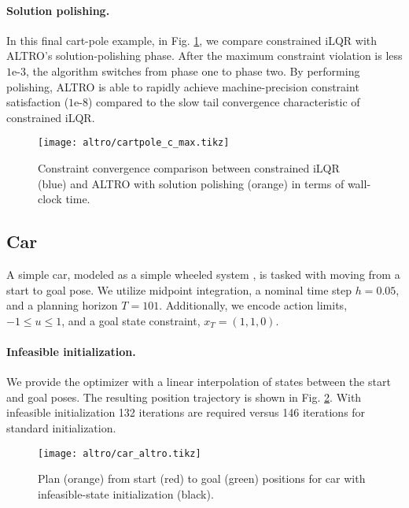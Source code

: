 \paragraph{Solution polishing.}
In this final cart-pole example, in Fig. \ref{altro_solution_polishing_comparison}, we compare constrained iLQR with ALTRO's solution-polishing phase. After the maximum constraint violation is less $1\text{e-}3$, the algorithm switches from phase one to phase two. By performing polishing, ALTRO is able to rapidly achieve machine-precision constraint satisfaction ($1\text{e-}8$) compared to the slow tail convergence characteristic of constrained iLQR.

\begin{figure}[H]
	\begin{center}
		\texttt{[image: altro/cartpole\_c\_max.tikz]}
	\end{center}
	\caption[Convergence comparison between constrained iLQR and ALTRO solution polishing]{Constraint convergence comparison between constrained iLQR (blue) and ALTRO with solution polishing (orange) in terms of wall-clock time.}
	\label{altro_solution_polishing_comparison}
\end{figure}

\subsection{Car}
A simple car, modeled as a simple wheeled system \cite{lavalle2006planning}, is tasked with moving from a start to goal pose. We utilize midpoint integration, a nominal time step $h = 0.05$, and a planning horizon $T = 101$. Additionally, we encode action limits, $-1 \leq u \leq 1$, and a goal state constraint, $x_T = (1, 1, 0)$.

\paragraph{Infeasible initialization.}
We provide the optimizer with a linear interpolation of states between the start and goal poses. The resulting position trajectory is shown in Fig. \ref{altro_car_infeasible}. With infeasible initialization 132 iterations are required versus 146 iterations for standard initialization.
\begin{figure}[H]
	\begin{center}
		\texttt{[image: altro/car\_altro.tikz]}
	\end{center}
	\caption[Position trajectory planned with infeasible initialization for car]{Plan (orange) from start (red) to goal (green) positions for car with infeasible-state initialization (black).}
	\label{altro_car_infeasible}
\end{figure}

